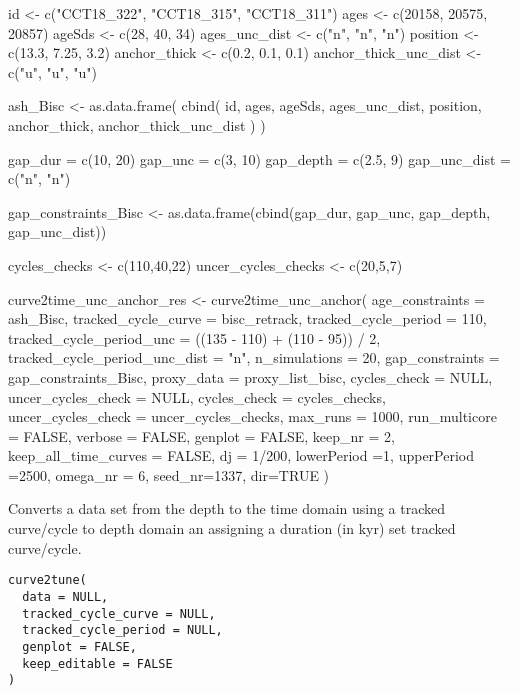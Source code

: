 \documentclass[a4paper]{book}
\begin{document}
\begin{References}
id <- c("CCT18\_322", "CCT18\_315", "CCT18\_311")
ages <- c(20158, 20575, 20857)
ageSds <- c(28, 40, 34)
ages\_unc\_dist <- c("n", "n", "n")
position <- c(13.3, 7.25, 3.2)
anchor\_thick <- c(0.2, 0.1, 0.1)
anchor\_thick\_unc\_dist <- c("u", "u", "u")

ash\_Bisc <-
 as.data.frame(
   cbind(
     id,
     ages,
     ageSds,
     ages\_unc\_dist,
     position,
     anchor\_thick,
     anchor\_thick\_unc\_dist
   )
 )

gap\_dur = c(10, 20)
gap\_unc = c(3, 10)
gap\_depth = c(2.5, 9)
gap\_unc\_dist = c("n", "n")


gap\_constraints\_Bisc <-
 as.data.frame(cbind(gap\_dur, gap\_unc, gap\_depth, gap\_unc\_dist))

cycles\_checks <- c(110,40,22)
uncer\_cycles\_checks <- c(20,5,7)

curve2time\_unc\_anchor\_res <-
 curve2time\_unc\_anchor(
 age\_constraints =  ash\_Bisc,
  tracked\_cycle\_curve =  bisc\_retrack,
  tracked\_cycle\_period = 110,
   tracked\_cycle\_period\_unc = ((135 - 110) + (110 - 95)) / 2,
  tracked\_cycle\_period\_unc\_dist = "n",
   n\_simulations = 20,
   gap\_constraints = gap\_constraints\_Bisc,
   proxy\_data = proxy\_list\_bisc,
   cycles\_check = NULL,
   uncer\_cycles\_check = NULL,
   cycles\_check = cycles\_checks,
   uncer\_cycles\_check = uncer\_cycles\_checks,
  max\_runs = 1000,
   run\_multicore = FALSE,
   verbose = FALSE,
   genplot = FALSE,
   keep\_nr = 2,
   keep\_all\_time\_curves = FALSE,
   dj = 1/200,
   lowerPeriod =1,
   upperPeriod =2500,
   omega\_nr = 6,
   seed\_nr=1337,
   dir=TRUE
 )















\end{References}
%
\begin{Description}
Converts a data set from the depth to the time domain
using a tracked curve/cycle to depth domain an assigning a duration (in kyr) set
tracked curve/cycle.
\end{Description}
%
\begin{Usage}
\begin{verbatim}
curve2tune(
  data = NULL,
  tracked_cycle_curve = NULL,
  tracked_cycle_period = NULL,
  genplot = FALSE,
  keep_editable = FALSE
)
\end{verbatim}
\end{Usage}
\end{document}
